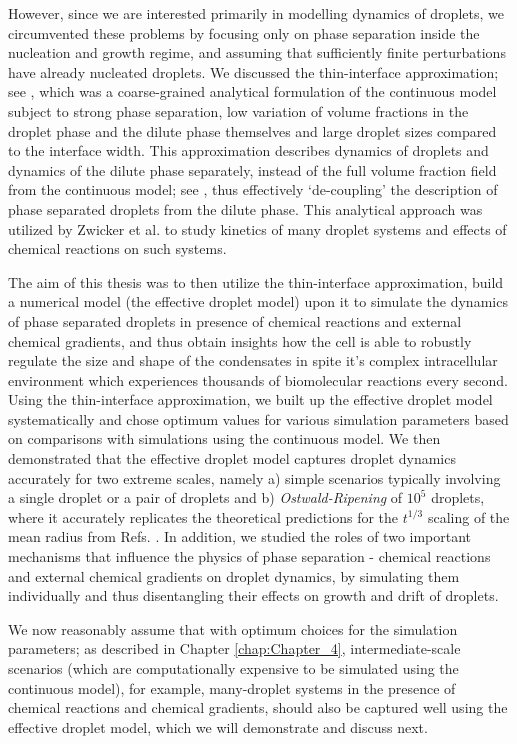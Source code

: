 However, since we are interested primarily in modelling dynamics of droplets, we circumvented these problems by focusing only on phase separation inside the nucleation and growth regime, and assuming that sufficiently finite perturbations have already nucleated droplets.
We discussed the thin-interface approximation; see , which was a coarse-grained analytical formulation of the continuous model subject to strong phase separation, low variation of volume fractions in the droplet phase and the dilute phase themselves and large droplet sizes compared to the interface width.
This approximation describes dynamics of droplets and dynamics of the dilute phase separately, instead of the full volume fraction field from the continuous model; see , thus effectively `de-coupling' the description of phase separated droplets from the dilute phase.
This analytical approach was utilized by Zwicker et al. \cite{Zwicker2015} to study kinetics of many droplet systems and effects of chemical reactions on such systems.

The aim of this thesis was to then utilize the thin-interface approximation, build a numerical model (the effective droplet model) upon it to simulate the dynamics of phase separated droplets in presence of chemical reactions and external chemical gradients, and thus obtain insights how the cell is able to robustly regulate the size and shape of the condensates in spite it's complex intracellular environment which experiences thousands of biomolecular reactions every second.
Using the thin-interface approximation, we built up the effective droplet model systematically and chose optimum values for various simulation parameters based on comparisons with simulations using the continuous model.
We then demonstrated that the effective droplet model captures droplet dynamics accurately for two extreme scales, namely a) simple scenarios typically involving a single droplet or a pair of droplets and b) \textit{Ostwald-Ripening} of $10^5$ droplets, where it accurately replicates the theoretical predictions for the $t^{1/3}$ scaling of the mean radius from Refs. \cite{LSWanalytics,Lifshitz}.
In addition, we studied the roles of two important mechanisms that influence the physics of phase separation - chemical reactions and external chemical gradients on droplet dynamics, by simulating them individually and thus disentangling their effects on growth and drift of droplets.

We now reasonably assume that with optimum choices for the simulation parameters; as described in Chapter \ref{chap:Chapter_4}, intermediate-scale scenarios (which are computationally expensive to be simulated using the continuous model), for example, many-droplet systems in the presence of chemical reactions and chemical gradients, should also be captured well using the effective droplet model, which we will demonstrate and discuss next.

